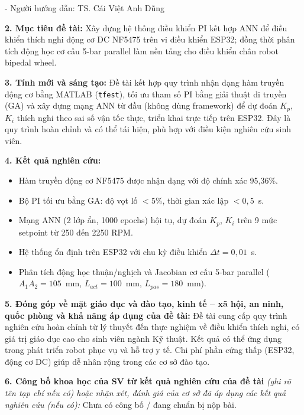{\vspace{0.15cm}
\noindent- Người hướng dẫn: TS. Cái Việt Anh Dũng

\vspace{0.25cm}
\noindent\textbf{2. Mục tiêu đề tài:} Xây dựng hệ thống điều khiển PI kết hợp ANN để điều
khiển thích nghi động cơ DC NF5475 trên vi điều khiển ESP32; đồng thời phân tích động học
cơ cấu 5-bar parallel làm nền tảng cho điều khiển chân robot bipedal wheel.

\vspace{0.25cm}
\noindent\textbf{3. Tính mới và sáng tạo:} Đề tài kết hợp quy trình nhận dạng hàm truyền
động cơ bằng MATLAB (\texttt{tfest}), tối ưu tham số PI bằng giải thuật di truyền (GA) và
xây dựng mạng ANN từ đầu (không dùng framework) để dự đoán $K_p$, $K_i$ thích nghi theo
sai số vận tốc thực, triển khai trực tiếp trên ESP32. Đây là quy trình hoàn chỉnh và có
thể tái hiện, phù hợp với điều kiện nghiên cứu sinh viên.

\vspace{0.25cm}
\noindent\textbf{4. Kết quả nghiên cứu:}
\begin{itemize}[leftmargin=0.5cm, topsep=2pt, itemsep=0pt]
    \item Hàm truyền động cơ NF5475 được nhận dạng với độ chính xác 95,36\%.
    \item Bộ PI tối ưu bằng GA: độ vọt lố $<5\%$, thời gian xác lập $<0{,}5$~s.
    \item Mạng ANN (2 lớp ẩn, 1000 epochs) hội tụ, dự đoán $K_p$, $K_i$ trên 9 mức
    setpoint từ 250 đến 2250 RPM.
    \item Hệ thống ổn định trên ESP32 với chu kỳ điều khiển $\Delta t = 0{,}01$~s.
    \item Phân tích động học thuận/nghịch và Jacobian cơ cấu 5-bar parallel
    ($A_1A_2 = 105$~mm, $L_{act} = 100$~mm, $L_{pas} = 180$~mm).
\end{itemize}

\vspace{0.2cm}
\noindent\textbf{5. Đóng góp về mặt giáo dục và đào tạo, kinh tế -- xã hội, an ninh, quốc
phòng và khả năng áp dụng của đề tài:} Đề tài cung cấp quy trình nghiên cứu hoàn chỉnh từ
lý thuyết đến thực nghiệm về điều khiển thích nghi, có giá trị giáo dục cao cho sinh viên
ngành Kỹ thuật. Kết quả có thể ứng dụng trong phát triển robot phục vụ và hỗ trợ y tế. Chi
phí phần cứng thấp (ESP32, động cơ DC) giúp dễ nhân rộng trong các cơ sở đào tạo.

\vspace{0.2cm}
\noindent\textbf{6. Công bố khoa học của SV từ kết quả nghiên cứu của đề tài}
\textit{(ghi rõ tên tạp chí nếu có) hoặc nhận xét, đánh giá của cơ sở đã áp dụng các kết
quả nghiên cứu (nếu có):} Chưa có công bố / đang chuẩn bị nộp bài.

}
